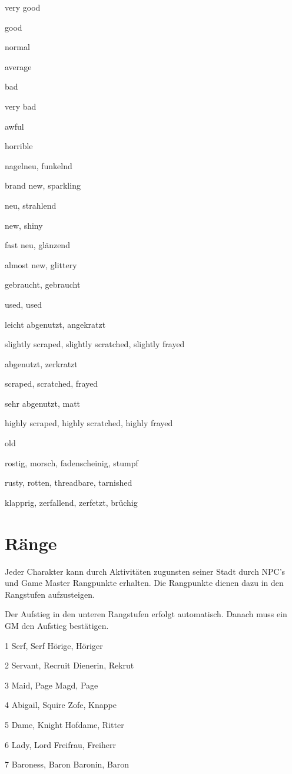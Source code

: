 \documentclass[a4paper,11pt]{book}
\begin{document}
very good

good

normal

average

bad

very bad

awful

horrible

nagelneu, funkelnd

brand new, sparkling

neu, strahlend

new, shiny

fast neu, glänzend

almost new, glittery

gebraucht, gebraucht

used, used

leicht abgenutzt, angekratzt

slightly scraped, slightly scratched, slightly frayed

abgenutzt, zerkratzt

scraped, scratched, frayed

sehr abgenutzt, matt

highly scraped, highly scratched, highly frayed

old

rostig, morsch, fadenscheinig, stumpf

rusty, rotten, threadbare, tarnished

klapprig, zerfallend, zerfetzt, brüchig

\section{Ränge}

Jeder Charakter kann durch Aktivitäten zugunsten seiner Stadt durch NPC’s und Game Master Rangpunkte erhalten. Die Rangpunkte dienen dazu in den Rangstufen aufzusteigen.

Der Aufstieg in den unteren Rangstufen erfolgt automatisch. Danach muss ein GM den Aufstieg bestätigen.

1  Serf, Serf  Hörige, Höriger

2  Servant, Recruit  Dienerin, Rekrut

3  Maid, Page  Magd, Page

4  Abigail, Squire  Zofe, Knappe

5  Dame, Knight  Hofdame, Ritter

6  Lady, Lord  Freifrau, Freiherr

7  Baroness, Baron  Baronin, Baron
\end{document}
